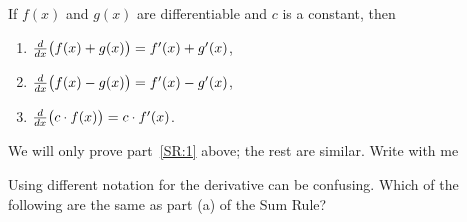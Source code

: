 \documentclass{ximera}
\begin{document}
\begin{theorem}\label{theorem:sum rule}
If $f(x)$ and $g(x)$ are differentiable and $c$ is a constant, then 
\begin{enumerate}
\item\label{SR:1} $\frac{d}{dx} \big( f(x) + g(x)\big) = f'(x) + g'(x)$,
\item $\frac{d}{dx} \big( f(x) - g(x)\big) = f'(x) - g'(x)$,
\item $\frac{d}{dx} \big(c\cdot f(x)\big) = c\cdot f'(x)$.
\end{enumerate}

\begin{explanation}
We will only prove part~\ref{SR:1} above; the rest are similar. Write with me
\begin{image}
\end{image}
\end{explanation}
\end{theorem}

\begin{question}
  Using different notation for the derivative can be confusing.  Which of the
  following are the same as part (a) of the Sum Rule?
  \begin{selectAll}
  \end{selectAll}
\end{question}
\end{document}
